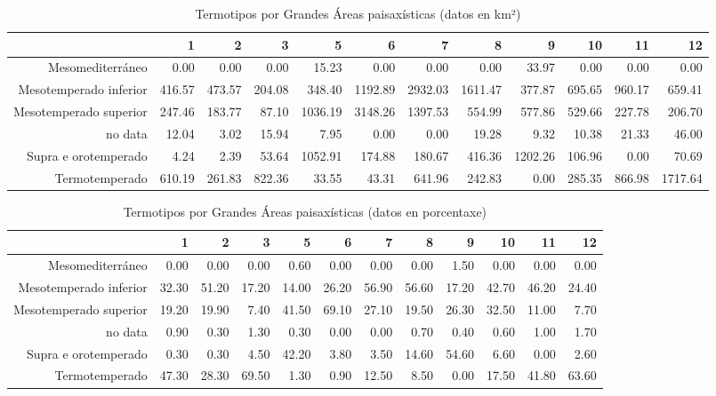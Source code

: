 \begin{table}[p]
\centering
\caption{Termotipos por Grandes Áreas paisaxísticas (datos en km²)} 
\label{xtaboa3}
\begin{tabular}{rrrrrrrrrrrr}
  \hline
 & 1 & 2 & 3 & 5 & 6 & 7 & 8 & 9 & 10 & 11 & 12 \\ 
  \hline
Mesomediterráneo & 0.00 & 0.00 & 0.00 & 15.23 & 0.00 & 0.00 & 0.00 & 33.97 & 0.00 & 0.00 & 0.00 \\ 
  Mesotemperado inferior & 416.57 & 473.57 & 204.08 & 348.40 & 1192.89 & 2932.03 & 1611.47 & 377.87 & 695.65 & 960.17 & 659.41 \\ 
  Mesotemperado superior & 247.46 & 183.77 & 87.10 & 1036.19 & 3148.26 & 1397.53 & 554.99 & 577.86 & 529.66 & 227.78 & 206.70 \\ 
  no data & 12.04 & 3.02 & 15.94 & 7.95 & 0.00 & 0.00 & 19.28 & 9.32 & 10.38 & 21.33 & 46.00 \\ 
  Supra e orotemperado & 4.24 & 2.39 & 53.64 & 1052.91 & 174.88 & 180.67 & 416.36 & 1202.26 & 106.96 & 0.00 & 70.69 \\ 
  Termotemperado & 610.19 & 261.83 & 822.36 & 33.55 & 43.31 & 641.96 & 242.83 & 0.00 & 285.35 & 866.98 & 1717.64 \\ 
   \hline
\end{tabular}
\end{table}
\begin{table}[p]
\centering
\caption{Termotipos por Grandes Áreas paisaxísticas (datos en porcentaxe)} 
\label{xtaboa3p}
\begin{tabular}{rrrrrrrrrrrr}
  \hline
 & 1 & 2 & 3 & 5 & 6 & 7 & 8 & 9 & 10 & 11 & 12 \\ 
  \hline
Mesomediterráneo & 0.00 & 0.00 & 0.00 & 0.60 & 0.00 & 0.00 & 0.00 & 1.50 & 0.00 & 0.00 & 0.00 \\ 
  Mesotemperado inferior & 32.30 & 51.20 & 17.20 & 14.00 & 26.20 & 56.90 & 56.60 & 17.20 & 42.70 & 46.20 & 24.40 \\ 
  Mesotemperado superior & 19.20 & 19.90 & 7.40 & 41.50 & 69.10 & 27.10 & 19.50 & 26.30 & 32.50 & 11.00 & 7.70 \\ 
  no data & 0.90 & 0.30 & 1.30 & 0.30 & 0.00 & 0.00 & 0.70 & 0.40 & 0.60 & 1.00 & 1.70 \\ 
  Supra e orotemperado & 0.30 & 0.30 & 4.50 & 42.20 & 3.80 & 3.50 & 14.60 & 54.60 & 6.60 & 0.00 & 2.60 \\ 
  Termotemperado & 47.30 & 28.30 & 69.50 & 1.30 & 0.90 & 12.50 & 8.50 & 0.00 & 17.50 & 41.80 & 63.60 \\ 
   \hline
\end{tabular}
\end{table}
